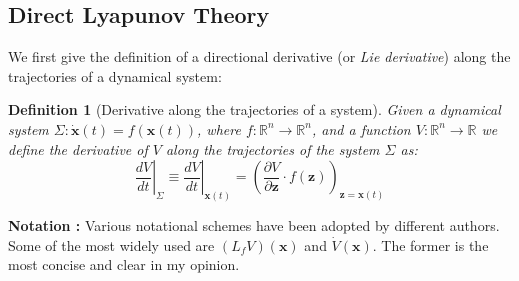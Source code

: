 \documentclass[a4paper,10pt,oneside]{book}
\newtheorem{definition}{Definition}
\begin{document}
\subsection{Direct Lyapunov Theory}
We first give the definition of a directional derivative (or \emph{Lie derivative}) along the trajectories of a dynamical system:
%
%
\begin{definition}[Derivative along the trajectories of a system]
 Given a dynamical system $\Sigma:\dot{\mathbf{x}}(t)=f(\mathbf{x}(t))$, where $f:\mathbb{R}^n\to\mathbb{R}^n$, and a function $V:\mathbb{R}^n\to\mathbb{R}$ we define the derivative of $V$ along the trajectories of the system $\Sigma$ as:
 \begin{equation}
  \left.\frac{dV}{dt}\right|_{\Sigma} \equiv  \left.\frac{dV}{dt}\right|_{\mathbf{x}(t)} = 
\left( \frac{\partial V}{\partial \mathbf{z}}\cdot f(\mathbf{z}) \right)_{\mathbf{z}=\mathbf{x}(t)}
 \end{equation}
\end{definition}
%
% 
\noindent \textbf{Notation :} Various notational schemes have been adopted by different authors. Some of the most widely used are $(L_f V)(\mathbf{x})$ and $\dot{V}(\mathbf{x})$. The former is the most concise and clear in my opinion.
%
%
%
\end{document}
